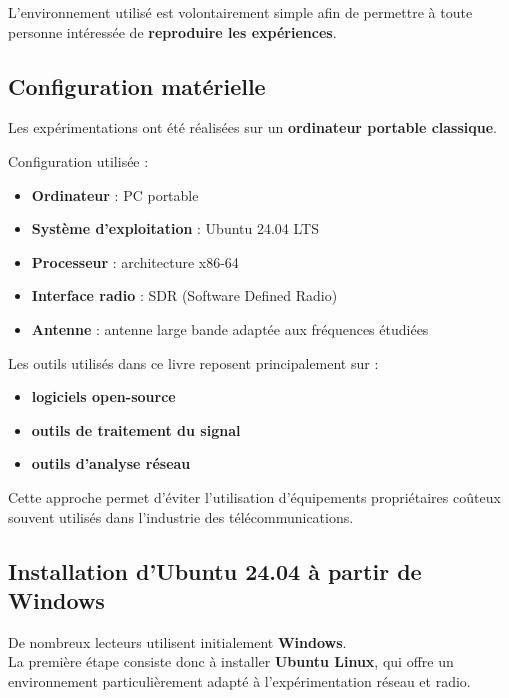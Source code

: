 \documentclass[
  french,
]{article}
\providecommand{\tightlist}{%
  \setlength{\itemsep}{0pt}\setlength{\parskip}{0pt}}
\begin{document}
L'environnement utilisé est volontairement simple afin de permettre à
toute personne intéressée de \textbf{reproduire les expériences}.

\subsection{Configuration matérielle}\label{configuration-matuxe9rielle}

Les expérimentations ont été réalisées sur un \textbf{ordinateur
portable classique}.

Configuration utilisée :

\begin{itemize}
\tightlist
\item
  \textbf{Ordinateur} : PC portable
\item
  \textbf{Système d'exploitation} : Ubuntu 24.04 LTS
\item
  \textbf{Processeur} : architecture x86-64
\item
  \textbf{Interface radio} : SDR (Software Defined Radio)
\item
  \textbf{Antenne} : antenne large bande adaptée aux fréquences étudiées
\end{itemize}

Les outils utilisés dans ce livre reposent principalement sur :

\begin{itemize}
\tightlist
\item
  \textbf{logiciels open-source}
\item
  \textbf{outils de traitement du signal}
\item
  \textbf{outils d'analyse réseau}
\end{itemize}

Cette approche permet d'éviter l'utilisation d'équipements propriétaires
coûteux souvent utilisés dans l'industrie des télécommunications.

\subsection{Installation d'Ubuntu 24.04 à partir de
Windows}\label{installation-dubuntu-24.04-uxe0-partir-de-windows}

De nombreux lecteurs utilisent initialement \textbf{Windows}.\\
La première étape consiste donc à installer \textbf{Ubuntu Linux}, qui
offre un environnement particulièrement adapté à l'expérimentation
réseau et radio.
\end{document}
